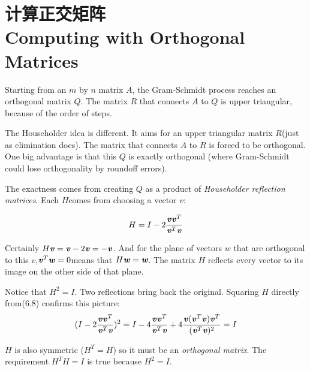 \section[计算正交矩阵]{计算正交矩阵\\Computing with Orthogonal Matrices}
\begin{flushleft}
	Starting from an $m$ by $n$ matrix $A$, the Gram-Schmidt process reaches an orthogonal matrix $Q$. The matrix $R$ that connects $A$ to $Q$ is upper triangular, because of the order of steps.
\end{flushleft}
The Householder idea is different. It aims for an upper triangular matrix $R$(just as elimination does). The matrix that connects $A$ to $R$ is forced to be orthogonal. One big advantage is that this $Q$ is exactly orthogonal (where Gram-Schmidt could lose orthogonality by roundoff errors).

The exactness comes from creating $Q$ as a product of \textit{Householder reflection matrices}. Each $H$comes from choosing a vector $v$:

\begin{align}
H=I-2\frac{\textbf{\textit{v}}\textbf{\textit{v}}^{T}}{\textbf{\textit{v}}^{T}\textbf{\textit{v}}}
\end{align}
\begin{flushleft}
	Certainly $H\textbf{\textit{v}}=\textbf{\textit{v}}-2\textbf{\textit{v}}=-\textbf{\textit{v}}$. And for the plane of vectors $w$ that are orthogonal to this $v$,$ \textbf{\textit{v}}^{T}\textbf{\textit{w}}=0$means that $ H\textbf{\textit{w}}=\textbf{\textit{w}}$. The matrix $H$ reflects every vector to its image on the other side of that plane.
\end{flushleft}

Notice that $H^{2}=I$. Two reflections bring back the original. Squaring $H$ directly  from(6.8) confirms this picture:
\begin{align*}
(I-2\frac{\textbf{\textit{v}}\textbf{\textit{v}}^{T}}{\textbf{\textit{v}}^{T}\textbf{\textit{v}}})^{2}=I-4\frac{\textbf{\textit{v}}\textbf{\textit{v}}^{T}}{\textbf{\textit{v}}^{T}\textbf{\textit{v}}}+4\frac{\textbf{\textit{v}}(\textbf{\textit{v}}^{T}\textbf{\textit{v}})\textbf{\textit{v}}^{T}}{(\textbf{\textit{v}}^{T}\textbf{\textit{v}})^{2}}=I
\end{align*}
\begin{flushleft}
	$H$ is also symmetric ($H^{T}=H$) so it must be an \textit{orthogonal matrix}.  The requirement $H^{T}H=I$ is true because $H^{2}=I$.
\end{flushleft}

